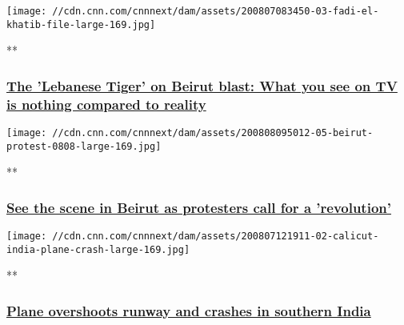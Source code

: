 \href{/videos/sports/2020/08/07/fadi-el-khatib-basketball-hero-lebanon-beirut-explosion-charity-spt-intl-lon-orig.cnn/video/playlists/around-the-world/}{}

\texttt{[image: //cdn.cnn.com/cnnnext/dam/assets/200807083450-03-fadi-el-khatib-file-large-169.jpg]}

**

\hypertarget{the-lebanese-tiger-on-beirut-blast-what-you-see-on-tv-is-nothing-compared-to-reality}{%
\subsubsection{\texorpdfstring{\href{/videos/sports/2020/08/07/fadi-el-khatib-basketball-hero-lebanon-beirut-explosion-charity-spt-intl-lon-orig.cnn/video/playlists/around-the-world/}{The
'Lebanese Tiger' on Beirut blast: What you see on TV is nothing compared
to
reality}}{The 'Lebanese Tiger' on Beirut blast: What you see on TV is nothing compared to reality}}\label{the-lebanese-tiger-on-beirut-blast-what-you-see-on-tv-is-nothing-compared-to-reality}}

\href{/videos/world/2020/08/08/protesters-in-beirut-wedeman-vpx.cnn/video/playlists/around-the-world/}{}

\texttt{[image: //cdn.cnn.com/cnnnext/dam/assets/200808095012-05-beirut-protest-0808-large-169.jpg]}

**

\hypertarget{see-the-scene-in-beirut-as-protesters-call-for-a-revolution-}{%
\subsubsection{\texorpdfstring{\href{/videos/world/2020/08/08/protesters-in-beirut-wedeman-vpx.cnn/video/playlists/around-the-world/}{See
the scene in Beirut as protesters call for a 'revolution'
}}{See the scene in Beirut as protesters call for a 'revolution' }}\label{see-the-scene-in-beirut-as-protesters-call-for-a-revolution-}}

\href{/videos/world/2020/08/07/plane-crash-kozhikode-international-airport-air-india-express-vedika-sud-intl-vpx.cnn/video/playlists/around-the-world/}{}

\texttt{[image: //cdn.cnn.com/cnnnext/dam/assets/200807121911-02-calicut-india-plane-crash-large-169.jpg]}

**

\hypertarget{plane-overshoots-runway-and-crashes-in-southern-india}{%
\subsubsection{\texorpdfstring{\href{/videos/world/2020/08/07/plane-crash-kozhikode-international-airport-air-india-express-vedika-sud-intl-vpx.cnn/video/playlists/around-the-world/}{Plane
overshoots runway and crashes in southern
India}}{Plane overshoots runway and crashes in southern India}}\label{plane-overshoots-runway-and-crashes-in-southern-india}}

